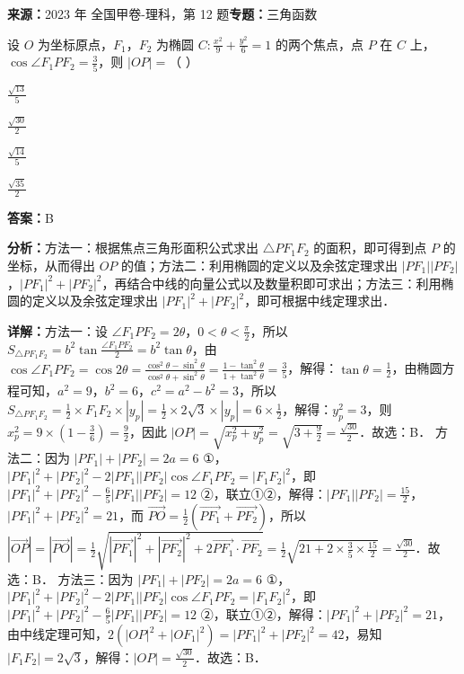 \begin{question}[points=5]
\textbf{来源：}2023 年 全国甲卷-理科，第 12 题\quad \textbf{专题：}三角函数\par
设 $O$ 为坐标原点，$F_1$，$F_2$ 为椭圆 $C: \frac{x^2}{9} + \frac{y^2}{6} = 1$ 的两个焦点，点 $P$ 在 $C$ 上，$\cos\angle F_1PF_2 = \frac{3}{5}$，则 $|OP| = $（         ）
\begin{choices}
  \item $\frac{\sqrt{13}}{5}$
  \item $\frac{\sqrt{30}}{2}$
  \item $\frac{\sqrt{14}}{5}$
  \item $\frac{\sqrt{35}}{2}$
\end{choices}
\begin{solution}
\textbf{答案：}B

\textbf{分析：}方法一：根据焦点三角形面积公式求出 $\triangle PF_1F_2$ 的面积，即可得到点 $P$ 的坐标，从而得出 $OP$ 的值；方法二：利用椭圆的定义以及余弦定理求出 $|PF_1||PF_2|$，$|PF_1|^2+|PF_2|^2$，再结合中线的向量公式以及数量积即可求出；方法三：利用椭圆的定义以及余弦定理求出 $|PF_1|^2+|PF_2|^2$，即可根据中线定理求出．

\textbf{详解：}方法一：设 $\angle F_1PF_2 = 2\theta$，$0<\theta<\frac{\pi}{2}$，所以 $S_{\triangle PF_1F_2} = b^2\tan\frac{\angle F_1PF_2}{2} = b^2\tan\theta$，由 $\cos\angle F_1PF_2 = \cos2\theta = \frac{\cos^2\theta-\sin^2\theta}{\cos^2\theta+\sin^2\theta} = \frac{1-\tan^2\theta}{1+\tan^2\theta} = \frac{3}{5}$，解得：$\tan\theta = \frac{1}{2}$，由椭圆方程可知，$a^2=9$，$b^2=6$，$c^2=a^2-b^2=3$，所以 $S_{\triangle PF_1F_2} = \frac{1}{2}\times F_1F_2\times|y_p| = \frac{1}{2}\times2\sqrt{3}\times|y_p| = 6\times\frac{1}{2}$，解得：$y_p^2=3$，则 $x_p^2 = 9\times\left(1-\frac{3}{6}\right) = \frac{9}{2}$，因此 $|OP| = \sqrt{x_p^2+y_p^2} = \sqrt{3+\frac{9}{2}} = \frac{\sqrt{30}}{2}$．故选：B．
方法二：因为 $|PF_1|+|PF_2|=2a=6$ ①，$|PF_1|^2+|PF_2|^2-2|PF_1||PF_2|\cos\angle F_1PF_2 = |F_1F_2|^2$，即 $|PF_1|^2+|PF_2|^2 - \frac{6}{5}|PF_1||PF_2| = 12$ ②，联立①②，解得：$|PF_1||PF_2| = \frac{15}{2}$，$|PF_1|^2+|PF_2|^2 = 21$，而 $\overrightarrow{PO} = \frac{1}{2}(\overrightarrow{PF_1}+\overrightarrow{PF_2})$，所以 $|\overrightarrow{OP}| = |\overrightarrow{PO}| = \frac{1}{2}\sqrt{|\overrightarrow{PF_1}|^2+|\overrightarrow{PF_2}|^2+2\overrightarrow{PF_1}\cdot\overrightarrow{PF_2}} = \frac{1}{2}\sqrt{21+2\times\frac{3}{5}\times\frac{15}{2}} = \frac{\sqrt{30}}{2}$．故选：B．
方法三：因为 $|PF_1|+|PF_2|=2a=6$ ①，$|PF_1|^2+|PF_2|^2-2|PF_1||PF_2|\cos\angle F_1PF_2 = |F_1F_2|^2$，即 $|PF_1|^2+|PF_2|^2 - \frac{6}{5}|PF_1||PF_2| = 12$ ②，联立①②，解得：$|PF_1|^2+|PF_2|^2 = 21$，由中线定理可知，$2(|OP|^2+|OF_1|^2) = |PF_1|^2+|PF_2|^2 = 42$，易知 $|F_1F_2| = 2\sqrt{3}$，解得：$|OP| = \frac{\sqrt{30}}{2}$．故选：B．
\end{solution}
\end{question}

